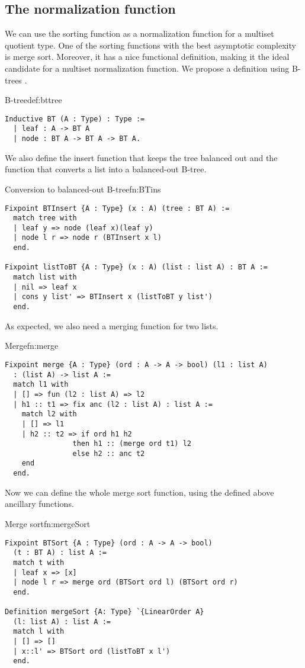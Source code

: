 \subsection{The normalization function}
We can use the sorting function as a normalization function for a multiset quotient type. One of the sorting functions with the best asymptotic complexity is merge sort. Moreover, it has a nice functional definition, making it the ideal candidate for a multiset normalization function. We propose a definition using B-trees \cite{Btree}.
\begin{defi}{B-tree}{def:bttree}
\begin{verbatim}
Inductive BT (A : Type) : Type :=
  | leaf : A -> BT A
  | node : BT A -> BT A -> BT A.
\end{verbatim}
\end{defi}
We also define the insert function that keeps the tree balanced out and the function that converts a list into a balanced-out B-tree.
\begin{func}{Conversion to balanced-out B-tree}{fn:BTins}
\begin{verbatim}
Fixpoint BTInsert {A : Type} (x : A) (tree : BT A) :=
  match tree with
  | leaf y => node (leaf x)(leaf y)
  | node l r => node r (BTInsert x l)
  end.

Fixpoint listToBT {A : Type} (x : A) (list : list A) : BT A :=
  match list with
  | nil => leaf x
  | cons y list' => BTInsert x (listToBT y list')
  end.
\end{verbatim}
\end{func}
As expected, we also need a merging function for two lists.
\begin{func}{Merge}{fn:merge}
\begin{verbatim}
Fixpoint merge {A : Type} (ord : A -> A -> bool) (l1 : list A) 
  : (list A) -> list A :=
  match l1 with
  | [] => fun (l2 : list A) => l2
  | h1 :: t1 => fix anc (l2 : list A) : list A :=
    match l2 with
    | [] => l1
    | h2 :: t2 => if ord h1 h2 
                then h1 :: (merge ord t1) l2
                else h2 :: anc t2
    end
  end.
\end{verbatim}
\end{func}
Now we can define the whole merge sort function, using the defined above ancillary functions.
\begin{func}{Merge sort}{fn:mergeSort}
\begin{verbatim}
Fixpoint BTSort {A : Type} (ord : A -> A -> bool) 
  (t : BT A) : list A :=
  match t with
  | leaf x => [x]
  | node l r => merge ord (BTSort ord l) (BTSort ord r)
  end. 

Definition mergeSort {A: Type} `{LinearOrder A}
  (l: list A) : list A :=
  match l with
  | [] => []
  | x::l' => BTSort ord (listToBT x l')
  end.
\end{verbatim}
\end{func}
